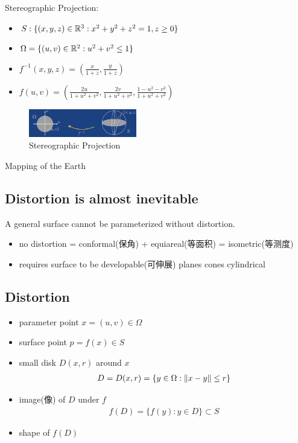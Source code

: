 Stereographic Projection:
\begin{itemize}
    \item $S:\{ (x,y,z)\in \mathbb{R}^3: x^2+y^2+z^2=1, z\ge 0 \}$
    \item $\Omega=\{ (u, v)\in \mathbb{R}^2:u^2+v^2\le 1 \}$
    \item $f^{-1}(x,y,z)=\left( \frac{x}{1+z}, \frac{y}{1+z} \right)$
    \item $f(u,v)=\left( \frac{2u}{1+u^2+v^2}, \frac{2v}{1+u^2+v^2}, \frac{1-u^2-v^2}{1+u^2+v^2} \right)$
\end{itemize}

\begin{figure}[!htb]
    \centering
    \includegraphics[width=0.42\textwidth]{pic/ACG2/Stereographic Projection}
    \caption{Stereographic Projection}
\end{figure}

Mapping of the Earth

\subsection{Distortion is almost inevitable}
\begin{theorem}
    A general surface cannot be parameterized without distortion.
\end{theorem}

\begin{itemize}
    \item no distortion = conformal(保角) + equiareal(等面积) = isometric(等测度)
    \item requires surface to be developable(可伸展)
    \subitem planes
    \subitem cones
    \subitem cylindrical
\end{itemize}

\subsection{Distortion}
\begin{itemize}
    \item parameter point $x=(u,v)\in\Omega$
    \item surface point $p=f(x)\in S$
    \item small disk $D(x,r)$ around $x$
    \begin{align*}
        D=D(x,r)=\{ y\in\Omega:\left\lVert x-y\right\rVert\le r \}
    \end{align*}
    \item image(像) of $D$ under $f$
    \begin{align*}
        f(D)=\{ f(y):y\in D \}\subset S
    \end{align*}
    \item shape of $f(D)$
\end{itemize}


